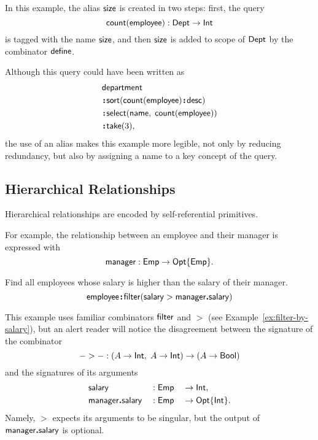 In this example, the alias $\mathsf{size}$ is created in two steps: first, the query
\begin{equation*}
    \mathsf{count}(\mathsf{employee}): \mathsf{Dept} \to \mathsf{Int}
\end{equation*}
is tagged with the name $\mathsf{size}$, and then $\mathsf{size}$ is added to scope of $\mathsf{Dept}$
by the combinator $\mathsf{define}$.

Although this query could have been written as
\begin{align*}
    & \Department \\
    & \Apply\Sort(\Count(\Employee)\Apply\Desc) \\
    & \Apply\Select(\Name,\; \Count(\Employee)) \\
    & \Apply\Take(3),
\end{align*}
the use of an alias makes this example more legible, not only by reducing
redundancy, but also by assigning a name to a key concept of the query.

\subsection*{Hierarchical Relationships}

Hierarchical relationships are encoded by self-referential primitives.

For example, the relationship between an employee and their manager is
expressed with
\begin{equation*}
    \mathsf{manager} : \mathsf{Emp} \to \mathsf{Opt}{\left\{\mathsf{Emp}\right\}}.
\end{equation*}

\begin{demo}
    \label{ex:employee-filter-salary-manager}
    Find all employees whose salary is higher than the salary of their manager.
    \begin{equation*}
        \mathsf{employee}\!\boldsymbol{:}\!\mathsf{filter}(\mathsf{salary}>\mathsf{manager}\boldsymbol{.}\mathsf{salary})
    \end{equation*}
\end{demo}

This example uses familiar combinators $\mathsf{filter}$ and ${>}$ (see
Example~\ref{ex:filter-by-salary}), but an alert reader will notice the
disagreement between the signature of the combinator
\begin{equation*}
    {-}>{-} : (A \to \mathsf{Int},\; A \to \mathsf{Int}) \to (A \to \mathsf{Bool})
\end{equation*}
and the signatures of its arguments
\begin{alignat*}{3}
    & \mathsf{salary} && : \mathsf{Emp} && \to \mathsf{Int}, \\
    & \mathsf{manager}\boldsymbol{.}\mathsf{salary} && : \mathsf{Emp} && \to \mathsf{Opt}{\left\{\mathsf{Int}\right\}}.
\end{alignat*}
Namely, ${>}$ expects its arguments to be singular, but the output of
$\mathsf{manager}\boldsymbol{.}\mathsf{salary}$ is optional.


